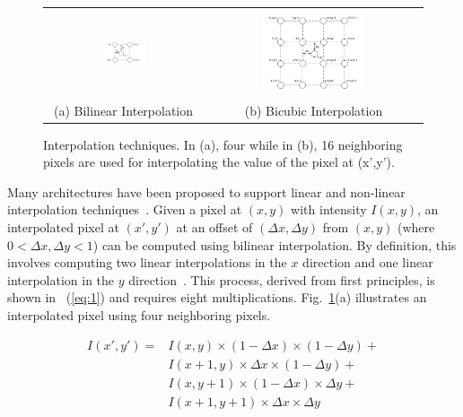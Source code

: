\begin{figure}[!htb]
\centering
\begin{tabular}{@{}c@{} @{}c@{}}
\includegraphics[width=0.3\textwidth]{./figures/bilinear.pdf} & \includegraphics[width=0.5\textwidth]{./figures/bicubic.pdf}\\[\abovecaptionskip]
\small (a) Bilinear Interpolation & \small (b) Bicubic Interpolation
\end{tabular}
\vspace{1pt}
\caption{Interpolation techniques. In (a), four while in (b), 16 neighboring pixels are used for interpolating the value of the pixel at (x',y').}
\label{tab:interpolation}
\end{figure}

Many architectures have been proposed to support linear 
and non-linear interpolation techniques~\cite{kesturdac}.
Given a pixel at $(x,y)$ with intensity $I(x,y)$, an interpolated pixel at $(x',y')$ at an offset of $(\Delta x, \Delta y)$ from $(x,y)$
(where $0<\Delta x,\Delta y<1$) can be computed using bilinear interpolation.
By definition, this involves computing two linear interpolations in the $x$ direction and one linear interpolation in the $y$ direction~\cite{IPHandbook}. 
This process, derived from first principles, is shown in ~(\ref{eq:1}) and requires eight multiplications. 
Fig.~\ref{tab:interpolation}(a) illustrates an interpolated pixel using four neighboring pixels.

\begin{equation}
\begin{split}
I(x',y') = &I(x,y) \times (1-\Delta x) \times (1-\Delta y) +\\ 
            &I(x+1,y) \times\Delta x \times (1-\Delta y) +\\ 
            &I(x,y+1) \times (1-\Delta x) \times\Delta y +\\ 
            &I(x+1,y+1) \times\Delta x \times\Delta y 
\end{split}
\label{eq:1}
\end{equation}

